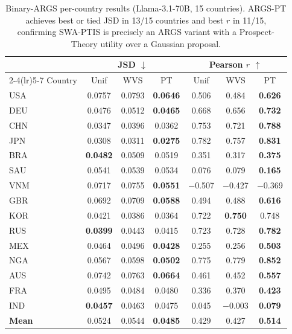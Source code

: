 \documentclass{article}
\begin{document}
\begin{table}[h]\centering\scriptsize
\caption{Binary-ARGS per-country results (Llama-3.1-70B, 15 countries).
\textsc{ARGS-PT} achieves best or tied JSD in 13/15 countries and best $r$ in
11/15, confirming SWA-PTIS is precisely an ARGS variant with a
Prospect-Theory utility over a Gaussian proposal.}
\label{tab:args_percountry}
\begin{tabular}{lcccccc}\toprule
 & \multicolumn{3}{c}{JSD $\downarrow$} & \multicolumn{3}{c}{Pearson $r$ $\uparrow$}\\
\cmidrule(lr){2-4}\cmidrule(lr){5-7}
Country & Unif & WVS & PT & Unif & WVS & PT \\\midrule
USA & 0.0757 & 0.0793 & \textbf{0.0646} & 0.506 & 0.484 & \textbf{0.626} \\
DEU & 0.0476 & 0.0512 & \textbf{0.0465} & 0.668 & 0.656 & \textbf{0.732} \\
CHN & 0.0347 & 0.0396 & 0.0362 & 0.753 & 0.721 & \textbf{0.788} \\
JPN & 0.0308 & 0.0311 & \textbf{0.0275} & 0.782 & 0.757 & \textbf{0.831} \\
BRA & \textbf{0.0482} & 0.0509 & 0.0519 & 0.351 & 0.317 & \textbf{0.375} \\
SAU & 0.0541 & 0.0539 & 0.0534 & 0.076 & 0.079 & \textbf{0.165} \\
VNM & 0.0717 & 0.0755 & \textbf{0.0551} & $-$0.507 & $-$0.427 & $-$0.369 \\
GBR & 0.0692 & 0.0709 & \textbf{0.0588} & 0.494 & 0.488 & \textbf{0.616} \\
KOR & 0.0421 & 0.0386 & 0.0364 & 0.722 & \textbf{0.750} & 0.748 \\
RUS & \textbf{0.0399} & 0.0443 & 0.0415 & 0.723 & 0.728 & \textbf{0.782} \\
MEX & 0.0464 & 0.0496 & \textbf{0.0428} & 0.255 & 0.256 & \textbf{0.503} \\
NGA & 0.0567 & 0.0598 & \textbf{0.0502} & 0.775 & 0.779 & \textbf{0.852} \\
AUS & 0.0742 & 0.0763 & \textbf{0.0664} & 0.461 & 0.452 & \textbf{0.557} \\
FRA & 0.0495 & 0.0484 & 0.0480 & 0.336 & 0.370 & \textbf{0.423} \\
IND & \textbf{0.0457} & 0.0463 & 0.0475 & 0.045 & $-$0.003 & \textbf{0.079} \\\midrule
\textbf{Mean} & 0.0524 & 0.0544 & \textbf{0.0485} & 0.429 & 0.427 & \textbf{0.514} \\\bottomrule
\end{tabular}
\end{table}
\end{document}
